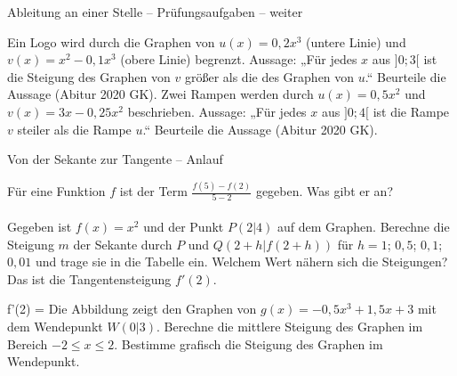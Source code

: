 \begin{aufgabe}{Ableitung an einer Stelle – Prüfungsaufgaben – weiter}
\begin{teile}
\teil Ein Logo wird durch die Graphen von $u(x) = 0{,}2x^3$ (untere Linie) und $v(x) = x^2 - 0{,}1x^3$ (obere Linie) begrenzt. Aussage: „Für jedes $x$ aus $]0; 3[$ ist die Steigung des Graphen von $v$ größer als die des Graphen von $u$.“ Beurteile die Aussage \hfill (Abitur 2020 GK).
\teil Zwei Rampen werden durch $u(x) = 0{,}5x^2$ und $v(x) = 3x - 0{,}25x^2$ beschrieben. Aussage: „Für jedes $x$ aus $]0; 4[$ ist die Rampe $v$ steiler als die Rampe $u$.“ Beurteile die Aussage \hfill (Abitur 2020 GK).
\end{teile}
\end{aufgabe}

\begin{aufgabe}{Von der Sekante zur Tangente – Anlauf}
\begin{teile}
\teil Für eine Funktion $f$ ist der Term $\frac{f(5) - f(2)}{5 - 2}$ gegeben. Was gibt er an? \\  \\ 
\teil Gegeben ist $f(x) = x^2$ und der Punkt $P(2 | 4)$ auf dem Graphen. Berechne die Steigung $m$ der Sekante durch $P$ und $Q(2 + h | f(2 + h))$ für $h = 1$; $0{,}5$; $0{,}1$; $0{,}01$ und trage sie in die Tabelle ein. Welchem Wert nähern sich die Steigungen? Das ist die Tangentensteigung $f'(2)$.

f'(2) = \leerfeld
\teil Die Abbildung zeigt den Graphen von $g(x) = -0{,}5x^3 + 1{,}5x + 3$ mit dem Wendepunkt $W(0 | 3)$. Berechne die mittlere Steigung des Graphen im Bereich $-2 \le x \le 2$. Bestimme grafisch die Steigung des Graphen im Wendepunkt.

\begin{ksys}[xmin=-3,xmax=3,ymin=-1,ymax=7,ablesen]\end{ksys}
\end{teile}
\end{aufgabe}

